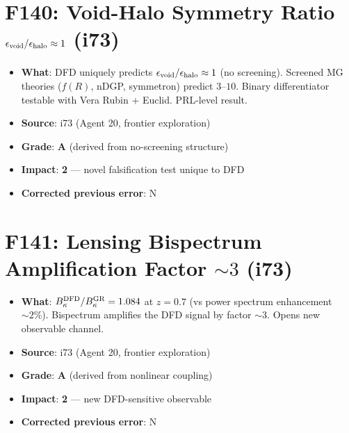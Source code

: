 \documentclass[11pt,a4paper]{article}
\newcommand{\grade}[1]{\textbf{#1}}
\newcommand{\impact}[1]{\textbf{#1}}
\begin{document}
\section{F140: Void-Halo Symmetry Ratio $\epsilon_{\rm void}/\epsilon_{\rm halo} \approx 1$ (i73)}
\begin{itemize}[nosep]
\item \textbf{What}: DFD uniquely predicts $\epsilon_{\rm void}/\epsilon_{\rm halo} \approx 1$ (no screening). Screened MG theories ($f(R)$, nDGP, symmetron) predict $3$--$10$. Binary differentiator testable with Vera Rubin + Euclid. PRL-level result.
\item \textbf{Source}: i73 (Agent 20, frontier exploration)
\item \textbf{Grade}: \grade{A} (derived from no-screening structure)
\item \textbf{Impact}: \impact{2} --- novel falsification test unique to DFD
\item \textbf{Corrected previous error}: N
\end{itemize}

\section{F141: Lensing Bispectrum Amplification Factor $\sim 3$ (i73)}
\begin{itemize}[nosep]
\item \textbf{What}: $B_\kappa^{\rm DFD}/B_\kappa^{\rm GR} = 1.084$ at $z = 0.7$ (vs power spectrum enhancement $\sim 2\%$). Bispectrum amplifies the DFD signal by factor $\sim 3$. Opens new observable channel.
\item \textbf{Source}: i73 (Agent 20, frontier exploration)
\item \textbf{Grade}: \grade{A} (derived from nonlinear coupling)
\item \textbf{Impact}: \impact{2} --- new DFD-sensitive observable
\item \textbf{Corrected previous error}: N
\end{itemize}

\end{document}
